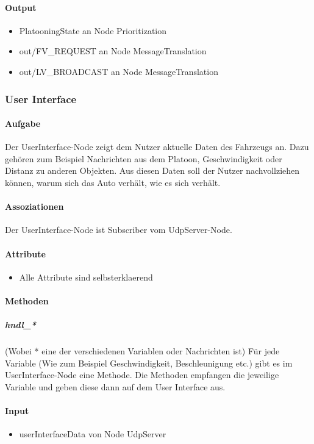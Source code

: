\documentclass[a4paper, 12pt, titlepage]{scrartcl}
\begin{document}
				\paragraph{Output}
					\begin{itemize}
    					\item PlatooningState an Node Prioritization
    					\item out/FV\_REQUEST an Node MessageTranslation
    					\item out/LV\_BROADCAST an Node MessageTranslation
    				\end{itemize}
						
		    \subsubsection{User Interface}
			\label{user_interfcae}
				\paragraph{Aufgabe} Der UserInterface-Node zeigt dem Nutzer aktuelle Daten des Fahrzeugs an. Dazu gehören zum Beispiel Nachrichten aus dem Platoon, Geschwindigkeit oder Distanz zu anderen Objekten. Aus diesen Daten soll der Nutzer nachvollziehen können, warum sich das Auto verhält, wie es sich verhält.
				\paragraph{Assoziationen} Der UserInterface-Node ist Subscriber vom UdpServer-Node.  
				\paragraph{Attribute}
					\begin{itemize}
					    \item Alle Attribute sind selbsterklaerend
					\end{itemize}
				\paragraph{Methoden}
					\subparagraph{hndl\_*} (Wobei * eine der verschiedenen Variablen oder Nachrichten ist) Für jede Variable (Wie zum Beispiel Geschwindigkeit, Beschleunigung etc.) gibt es im UserInterface-Node eine Methode. Die Methoden empfangen die jeweilige Variable und geben diese dann auf dem User Interface aus.
				\paragraph{Input}
				    \begin{itemize}
				        \item userInterfaceData von Node UdpServer
				    \end{itemize}
\end{document}
